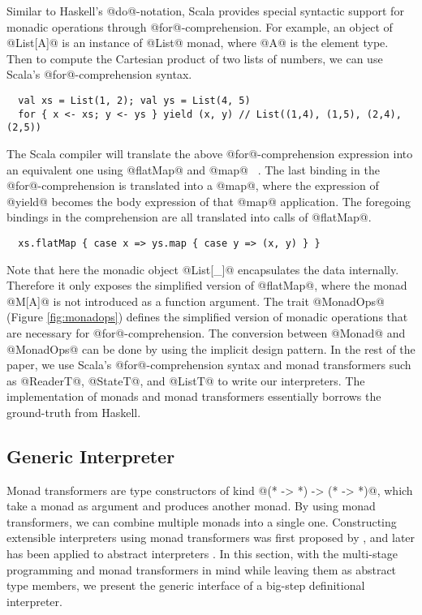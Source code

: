 Similar to Haskell's @do@-notation, Scala provides special syntactic support for
monadic operations through @for@-comprehension.
For example, an object of @List[A]@ is an instance of @List@ monad, where @A@ is the element type. 
Then to compute the Cartesian product of two lists of numbers, we can use Scala's
@for@-comprehension syntax.

\begin{lstlisting}
  val xs = List(1, 2); val ys = List(4, 5)
  for { x <- xs; y <- ys } yield (x, y) // List((1,4), (1,5), (2,4), (2,5))
\end{lstlisting}

The Scala compiler will translate the above @for@-comprehension expression into
an equivalent one using @flatMap@ and @map@ ~\cite{scala_spec}. The last binding
in the @for@-comprehension is translated into a @map@, where the expression of
@yield@ becomes the body expression of that @map@ application. The foregoing
bindings in the comprehension are all translated into calls of @flatMap@.

\begin{lstlisting}
  xs.flatMap { case x => ys.map { case y => (x, y) } }
\end{lstlisting}

Note that here the monadic object @List[_]@ encapsulates the data internally.
Therefore it only exposes the simplified version of @flatMap@, where the
monad @M[A]@ is not introduced as a function argument. The trait @MonadOps@
(Figure \ref{fig:monadops}) defines the simplified version of monadic
operations that are necessary for @for@-comprehension. 
The conversion between @Monad@ and @MonadOps@ can be done by using the implicit design pattern.
In the rest of the paper, we use Scala's @for@-comprehension syntax and monad
transformers such as @ReaderT@, @StateT@, and @ListT@ to write our interpreters.
The implementation of monads and monad transformers essentially borrows the
ground-truth from Haskell.

\subsection{Generic Interpreter} \label{generic_if}

Monad transformers are type constructors of kind @(* -> *) -> (* -> *)@, which
take a monad as argument and produces another monad. By using monad
transformers, we can combine multiple monads into a single one. Constructing
extensible interpreters using monad transformers was first proposed by
\citet{DBLP:conf/popl/LiangHJ95}, and later has been applied to abstract
interpreters \cite{Sergey:2013:MAI:2491956.2491979,
DBLP:journals/pacmpl/DaraisLNH17, Darais:2015:GTM:2814270.2814308}. In this section,
with the multi-stage programming and monad transformers in mind while leaving them
as abstract type members, we present the generic interface of a big-step
definitional interpreter.


